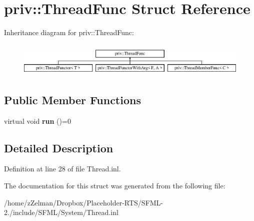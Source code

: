 \hypertarget{structpriv_1_1ThreadFunc}{\section{priv\-:\-:Thread\-Func Struct Reference}
\label{structpriv_1_1ThreadFunc}
}
Inheritance diagram for priv\-:\-:Thread\-Func\-:\begin{figure}[H]
\begin{center}
\leavevmode
\includegraphics[height=1.644640cm]{structpriv_1_1ThreadFunc}
\end{center}
\end{figure}
\subsection*{Public Member Functions}
\begin{DoxyCompactItemize}
\item 
\hypertarget{structpriv_1_1ThreadFunc_ab5465e714ca4aa92a09bf5e24410a5c3}{virtual void {\bfseries run} ()=0}\label{structpriv_1_1ThreadFunc_ab5465e714ca4aa92a09bf5e24410a5c3}

\end{DoxyCompactItemize}


\subsection{Detailed Description}


Definition at line 28 of file Thread.\-inl.



The documentation for this struct was generated from the following file\-:\begin{DoxyCompactItemize}
\item 
/home/z\-Zelman/\-Dropbox/\-Placeholder-\/\-R\-T\-S/\-S\-F\-M\-L-\/2./include/\-S\-F\-M\-L/\-System/Thread.\-inl\end{DoxyCompactItemize}
